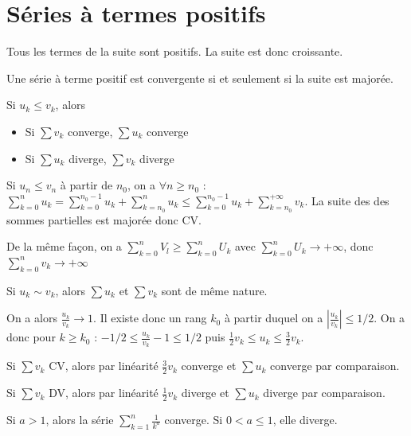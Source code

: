 \documentclass[french]{yLectureNote}
\begin{document}
\section{Séries à termes positifs}
Tous les termes de la suite sont positifs. La suite est donc croissante.

\begin{proposition}
Une série à terme positif est convergente si et seulement si la suite est majorée.
\end{proposition}
\begin{theorem}
 Si \(u_k\leq v_k\), alors

 \begin{itemize}
  \item Si \(\sum v_k\) converge,  \(\sum u_k\) converge
   \item Si \(\sum u_k\) diverge,  \(\sum v_k\) diverge
 \end{itemize}
\end{theorem}
\begin{myproof}
Si \(u_n\leq v_n\) à partir de \(n_0\), on a \(\forall n\geq n_0\) : \(\sum_{k=0}^n u_k = \sum_{k=0}^{n_0-1} u_k + \sum_{k=n_0}^n u_k \leq \sum_{k=0}^{n_0-1} u_k + \sum_{k=n_0}^{+\infty} v_k\). La suite des des sommes partielles est majorée donc CV.

De la m\^eme façon, on a \(\sum^n_{k=0}V_l\geq \sum^n_{k=0} U_k\) avec \(\sum^n_{k=0} U_k\to + \infty\), donc  \(\sum^n_{k=0} v_k\to + \infty\)
\end{myproof}
\begin{theorem}
 Si \(u_k\sim v_k\), alors \(\sum u_k\) et \(\sum v_k\) sont de m\^eme nature.
\end{theorem}
\begin{myproof}
On a alors \(\frac{u_k}{v_k} \to 1\). Il existe donc un rang $k_0$ à partir duquel on a \(|\frac{u_k}{v_k}|\leq 1/2\). On a donc pour \(k\geq k_0\) : \(-1/2\leq \frac{u_k}{v_k}-1\leq 1/2\) puis \(\frac{1}{2}v_k\leq u_k\leq \frac{3}{2}v_k\).

Si \(\sum v_k\) CV, alors par linéarité \(\frac{3}{2}v_k\) converge et \(\sum  u_k\) converge par comparaison.

Si \(\sum v_k\) DV, alors par linéarité \(\frac{1}{2}v_k\) diverge et \(\sum  u_k\) diverge par comparaison.
\end{myproof}
\begin{theorem}
 Si \(a>1\), alors la série \(\sum_{k=1}^n \frac{1}{k^a}\) converge. Si \(0<a\leq 1\), elle diverge.
\end{theorem}
\end{document}

